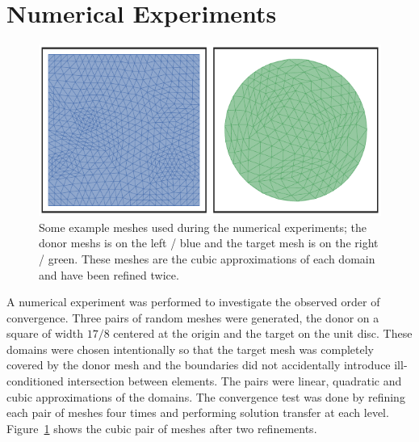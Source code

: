 \section{Numerical Experiments}

\begin{figure}
  \includegraphics{../images/solution-transfer/main_figure30.pdf}
  \centering
  \captionsetup{width=.75\linewidth}
  \caption{Some example meshes used during the numerical
    experiments; the donor meshs is on the left / blue and the target
    mesh is on the right / green. These meshes are the cubic approximations
    of each domain and have been refined twice.}
  \label{fig:meshes-used-refined}
\end{figure}

A numerical experiment was performed to investigate the observed order
of convergence. Three pairs of random meshes were generated, the donor
on a square of width \(17 / 8\) centered at the origin
and the target on the unit disc. These domains were chosen intentionally so
that the target mesh was completely covered by the donor mesh and the
boundaries did not accidentally introduce ill-conditioned intersection between
elements. The pairs were linear, quadratic and
cubic approximations of the domains. The convergence test was done by
refining each pair of meshes four times and performing solution transfer
at each level. Figure~\ref{fig:meshes-used-refined} shows the cubic
pair of meshes after two refinements.


